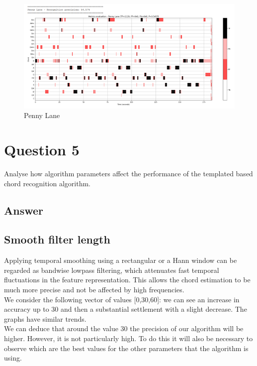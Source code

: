\documentclass[
	12pt, %
]{fphw}
\begin{document}
\begin{figure}[H]
 \centering
 \includegraphics[scale=1]{./images/4_penny_lane_metrics.png}
 \caption{Penny Lane}
\end{figure}


\section*{Question 5}

\begin{problem}
	Analyse how algorithm parameters affect the performance of the templated based chord recognition
algorithm.
\end{problem}


\subsection*{Answer}

\subsection{Smooth filter length} 
Applying temporal smoothing using a rectangular or a Hann window can be regarded as bandwise lowpass filtering, which attenuates fast temporal fluctuations in the feature representation. This allows the chord estimation to be much more precise and not be affected by high frequencies. \\

We consider the following vector of values [0,30,60]: we can see an increase in accuracy up to 30 and then a substantial settlement with a slight decrease. The graphs have similar trends.\\

We can deduce that around the value 30 the precision of our algorithm will be higher. However, it is not particularly high. To do this it will also be necessary to observe which are the best values for the other parameters that the algorithm is using. \\
\end{document}
